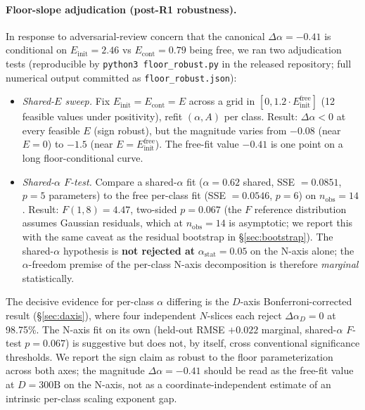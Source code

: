 \documentclass[10pt]{article}
\newcommand{\dalpha}{\Delta\alpha}
\begin{document}
\paragraph{Floor-slope adjudication (post-R1 robustness).}
In response to adversarial-review concern that the canonical
$\dalpha = -0.41$ is conditional on $E_\mathrm{init} = 2.46$ vs
$E_\mathrm{cont} = 0.79$ being free, we ran two adjudication tests
(reproducible by \texttt{python3 floor\_robust.py} in the released
repository; full numerical output committed as
\texttt{floor\_robust.json}):
\begin{itemize}
  \item \emph{Shared-$E$ sweep.} Fix
        $E_\mathrm{init} = E_\mathrm{cont} = E$ across a grid in
        $[0, 1.2 \cdot E_\mathrm{init}^\mathrm{free}]$ (12 feasible
        values under positivity), refit $(\alpha, A)$ per class.
        Result: $\dalpha < 0$ at every feasible $E$ (sign robust),
        but the magnitude varies from $-0.08$ (near $E{=}0$) to
        $-1.5$ (near $E{=}E_\mathrm{init}^\mathrm{free}$). The
        free-fit value $-0.41$ is one point on a long
        floor-conditional curve.
  \item \emph{Shared-$\alpha$ $F$-test.} Compare a shared-$\alpha$
        fit ($\alpha = 0.62$ shared, SSE $= 0.0851$, $p = 5$
        parameters) to the free per-class fit (SSE $= 0.0546$,
        $p = 6$) on $n_\mathrm{obs} = 14$. Result:
        $F(1, 8) = 4.47$, two-sided $p = 0.067$ (the $F$ reference
        distribution assumes Gaussian residuals, which at
        $n_\mathrm{obs} = 14$ is asymptotic; we report this with the
        same caveat as the residual bootstrap in \S\ref{sec:bootstrap}).
        The shared-$\alpha$ hypothesis is \textbf{not rejected at}
        $\alpha_\mathrm{stat} = 0.05$ on the N-axis alone; the
        $\alpha$-freedom premise of the per-class N-axis decomposition
        is therefore \emph{marginal} statistically.
\end{itemize}
The decisive evidence for per-class $\alpha$ differing is the
$D$-axis Bonferroni-corrected result (\S\ref{sec:daxis}), where four
independent $N$-slices each reject $\dalpha_D = 0$ at 98.75\%. The
N-axis fit on its own (held-out RMSE $+0.022$ marginal,
shared-$\alpha$ $F$-test $p = 0.067$) is suggestive but does not, by
itself, cross conventional significance thresholds. We report the
sign claim as robust to the floor parameterization across both axes;
the magnitude $\dalpha = -0.41$ should be read as the free-fit value
at $D{=}300\text{B}$ on the N-axis, not as a coordinate-independent
estimate of an intrinsic per-class scaling exponent gap.
\end{document}
